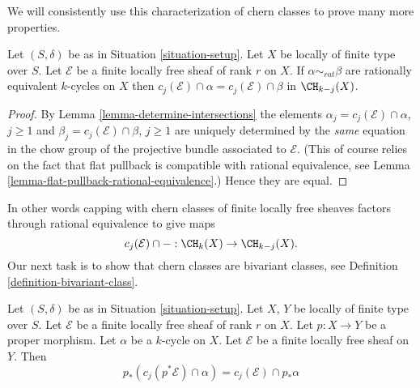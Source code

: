 \noindent
We will consistently use this characterization of chern classes
to prove many more properties.

\begin{lemma}
\label{lemma-cap-chern-class-factors-rational-equivalence}
Let $(S, \delta)$ be as in Situation \ref{situation-setup}.
Let $X$ be locally of finite type over $S$.
Let $\mathcal{E}$ be a finite locally free sheaf of rank $r$ on $X$.
If $\alpha \sim_{rat} \beta$ are rationally equivalent $k$-cycles
on $X$ then $c_j(\mathcal{E}) \cap \alpha = c_j(\mathcal{E}) \cap \beta$
in $\CH_{k - j}(X)$.
\end{lemma}

\begin{proof}
By Lemma \ref{lemma-determine-intersections} the elements
$\alpha_j = c_j(\mathcal{E}) \cap \alpha$, $j \geq 1$ and
$\beta_j = c_j(\mathcal{E}) \cap \beta$, $j \geq 1$ are uniquely determined
by the {\it same} equation in the chow group of the projective
bundle associated to $\mathcal{E}$. (This of course relies on the fact that
flat pullback is compatible with rational equivalence, see
Lemma \ref{lemma-flat-pullback-rational-equivalence}.) Hence they are equal.
\end{proof}

\noindent
In other words capping with chern classes of
finite locally free sheaves factors through rational equivalence
to give maps
$$
c_j(\mathcal{E}) \cap - : \CH_k(X) \to \CH_{k - j}(X).
$$
Our next task is to show that chern classes are bivariant classes, see
Definition \ref{definition-bivariant-class}.

\begin{lemma}
\label{lemma-pushforward-cap-cj}
Let $(S, \delta)$ be as in Situation \ref{situation-setup}.
Let $X$, $Y$ be locally of finite type over $S$.
Let $\mathcal{E}$ be a finite locally free sheaf of rank $r$ on $X$.
Let $p : X \to Y$ be a proper morphism.
Let $\alpha$ be a $k$-cycle on $X$.
Let $\mathcal{E}$ be a finite locally free sheaf on $Y$.
Then
$$
p_*(c_j(p^*\mathcal{E}) \cap \alpha) = c_j(\mathcal{E}) \cap p_*\alpha
$$
\end{lemma}

